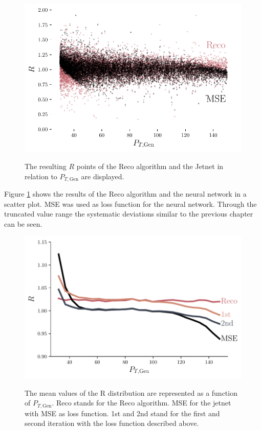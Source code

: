 \documentclass[12pt, a4paper]{thesis}
\begin{document}
\begin{figure}[htbp]
\centering
\includegraphics[width=.9\linewidth]{../images/jetnet_R_scatter.pdf}
\label{jetnet_R_scatter}
\caption{
The resulting \(R\) points of the Reco algorithm and the Jetnet in relation to \(P_{T, \text{Gen}}\) are displayed.}
\end{figure}

Figure \ref{jetnet_R_scatter} shows the results of the Reco algorithm
and the neural network in a scatter plot. MSE was used as loss
function for the neural network. Through the truncated value range the
systematic deviations similar to the previous chapter can be seen.

 
\begin{figure}[htbp]
  \caption{The mean values of the R distribution are represented as a
    function of \(P_{T, \text{Gen}}\). Reco stands for the Reco
    algorithm. MSE for the jetnet with MSE as loss function. 1st and
    2nd stand for the first and second iteration with the loss
    function described above.}
\includegraphics[width=.9\linewidth]{../images/jetnet_R.pdf}
\label{jetnet_R}
\end{figure}
\end{document}
